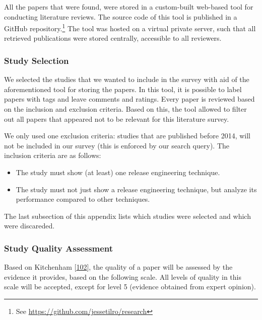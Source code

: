 \documentclass[]{book}
\providecommand{\tightlist}{%
  \setlength{\itemsep}{0pt}\setlength{\parskip}{0pt}}
\let\rmarkdownfootnote\footnote%
\def\footnote{\protect\rmarkdownfootnote}
\begin{document}
All the papers that were found, were stored in a custom-built web-based
tool for conducting literature reviews. The source code of this tool is
published in a GitHub repository.\footnote{See
  \url{https://github.com/jessetilro/research}} The tool was hosted on a
virtual private server, such that all retrieved publications were stored
centrally, accessible to all reviewers.

\subsubsection{Study Selection}\label{study-selection}

We selected the studies that we wanted to include in the survey with aid
of the aforementioned tool for storing the papers. In this tool, it is
possible to label papers with tags and leave comments and ratings. Every
paper is reviewed based on the inclusion and exclusion criteria. Based
on this, the tool allowed to filter out all papers that appeared not to
be relevant for this literature survey.

We only used one exclusion criteria: studies that are published before
2014, will not be included in our survey (this is enforced by our search
query). The inclusion criteria are as follows:

\begin{itemize}
\tightlist
\item
  The study must show (at least) one release engineering technique.
\item
  The study must not just show a release engineering technique, but
  analyze its performance compared to other techniques.
\end{itemize}

The last subsection of this appendix lists which studies were selected
and which were discareded.

\subsubsection{Study Quality Assessment}\label{study-quality-assessment}

Based on Kitchenham
{[}\protect\hyperlink{ref-kitchenham2004procedures}{102}{]}, the quality
of a paper will be assessed by the evidence it provides, based on the
following scale. All levels of quality in this scale will be accepted,
except for level 5 (evidence obtained from expert opinion).
\end{document}
